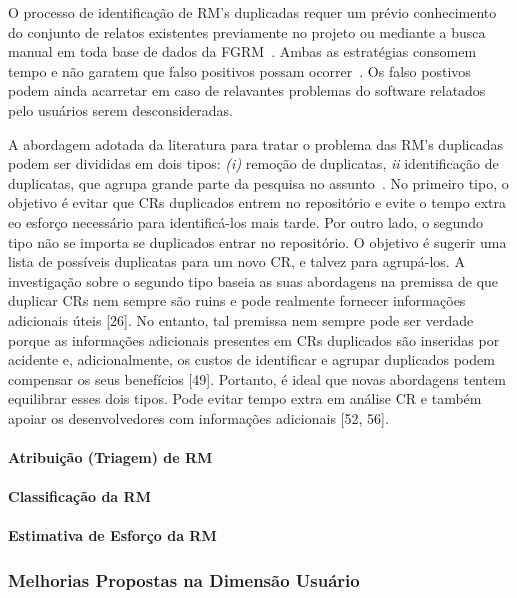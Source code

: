 O processo de identificação de RM's duplicadas requer um prévio conhecimento do
conjunto de relatos existentes previamente no projeto ou mediante a busca manual
em toda base de dados da FGRM~\cite{banerjee2012automated,
	Lerch:2013:FDY:2495256.2495763,hindle2016contextual}. Ambas as estratégias
consomem tempo e não garatem que falso positivos possam
ocorrer~\cite{kaushik2012comparative}. Os falso postivos podem ainda acarretar
em caso de relavantes problemas do software relatados pelo usuários serem
desconsideradas.

A abordagem adotada da literatura para tratar o problema das RM's duplicadas
podem ser divididas em dois tipos\cite{kaushik2012comparative,
	tian2012improved}: \textit{(i)} remoção de duplicatas, \textit{ii}
identificação de duplicatas, que agrupa grande parte da pesquisa no
assunto~\cite{cavalcanti2014challenges}. No primeiro tipo, o objetivo é evitar
que CRs duplicados entrem no repositório e evite o tempo extra eo esforço
necessário para identificá-los mais tarde. Por outro lado, o segundo tipo não se
importa se duplicados entrar no repositório. O objetivo é sugerir uma lista de
possíveis duplicatas para um novo CR, e talvez para agrupá-los. A investigação
sobre o segundo tipo baseia as suas abordagens na premissa de que duplicar CRs
nem sempre são ruins e pode realmente fornecer informações adicionais úteis
[26]. No entanto, tal premissa nem sempre pode ser verdade porque as informações
adicionais presentes em CRs duplicados são inseridas por acidente e,
adicionalmente, os custos de identificar e agrupar duplicados podem compensar os
seus benefícios [49]. Portanto, é ideal que novas abordagens tentem equilibrar
esses dois tipos. Pode evitar tempo extra em análise CR e também apoiar os
desenvolvedores com informações adicionais [52, 56].

\paragraph{Atribuição (Triagem) de RM}

\paragraph{Classificação da RM}

\paragraph{Estimativa de Esforço da RM}

\subsubsection{Melhorias Propostas na Dimensão Usuário}
\label{ssub:melhorias_dim_usuario}

